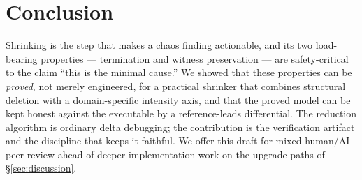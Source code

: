 \documentclass[10pt,twocolumn,letterpaper]{article}
\begin{document}
\section{Conclusion}\label{sec:conclusion}
Shrinking is the step that makes a chaos finding actionable, and its two
load-bearing properties --- termination and witness preservation --- are
safety-critical to the claim ``this is the minimal cause.'' We showed that these
properties can be \emph{proved}, not merely engineered, for a practical shrinker
that combines structural deletion with a domain-specific intensity axis, and that
the proved model can be kept honest against the executable by a reference-leads
differential. The reduction algorithm is ordinary delta debugging; the
contribution is the verification artifact and the discipline that keeps it
faithful. We offer this draft for mixed human/AI peer review ahead of deeper
implementation work on the upgrade paths of \S\ref{sec:discussion}.

{\footnotesize


}
\end{document}
